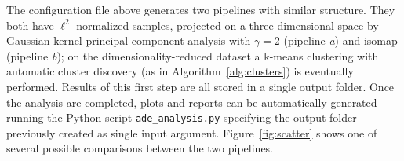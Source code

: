 \documentclass[twoside,11pt]{article}
\makeatletter
\newcommand{\ade}{{\sc adenine}\@\xspace}
\newcommand{\py}{{Python}\@\xspace}
\makeatother
\begin{document}
The configuration file above generates two pipelines with similar structure. They both have $\ell^2$-normalized samples, projected on a three-dimensional space by Gaussian kernel principal component analysis with $\gamma=2$ (pipeline \textit{a}) and isomap (pipeline \textit{b}); on the dimensionality-reduced dataset a k-means clustering with automatic cluster discovery (as in Algorithm~\ref{alg:clusters}) is eventually performed.
Results of this first step are all stored in a single output folder. Once the analysis are completed, plots and reports can be automatically generated running the \py script \texttt{ade\_analysis.py} specifying the output folder previously created as single input argument. Figure~\ref{fig:scatter} shows one of several possible comparisons between the two pipelines.
\end{document}
